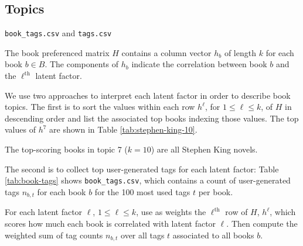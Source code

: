 \documentclass[11pt]{article}
\begin{document}
    \hypertarget{topics}{%
\subsection{Topics}\label{topics}}


\begin{table}[b]
\centering
\caption[\texttt{book\_tags.csv} and \texttt{tags.csv}]{\texttt{book\_tags.csv} and \texttt{tags.csv}}
\label{tab:tags-csv}
\begin{subtable}[l]{0.45\linewidth}
 \centering
 
    \label{tab:book-tags}
\end{subtable}%
\begin{subtable}[r]{0.45\linewidth}
 \centering
  
    \label{tab:tags}
\end{subtable}
\end{table}


The book preferenced matrix $H$ contains a column vector $h_b$ of length $k$ for each book $b \in B$.
The components of $h_b$ indicate the correlation between book $b$ and the $\ell^{\text{th}}$ latent factor.


We use two approaches to interpret each latent factor in order to describe book topics.
The first is to sort the values within each row $h^\ell$, for $1 \leq \ell \leq k$, of $H$ in descending order and list the associated top books indexing those values.
The top values of $h^7$ are shown in Table \ref{tab:stephen-king-10}.




\begin{table}[t]
\centering
  
  \caption[Stephen King ($k=10$)]{The top-scoring books in topic 7 ($k=10$) are all Stephen King novels.}
  \label{tab:stephen-king-10}
\end{table}




The second is to collect top user-generated tags for each latent factor:
Table \ref{tab:book-tags} shows \texttt{book\_tags.csv}, which contains a count of user-generated tags $n_{b,t}$ for each book $b$ for the 100 most used tags $t$ per book.






For each latent factor $\ell$, $1 \leq \ell \leq k$, use as weights the $\ell^{\text{th}}$ row of $H$, $h^\ell$,
which scores how much each book is correlated with latent factor $\ell$.
Then compute the weighted sum of tag counts $n_{b,t}$ over all tags $t$ associated to all books $b$.
\end{document}
